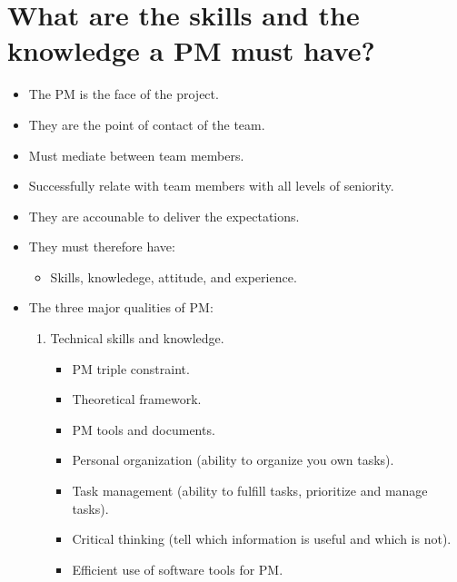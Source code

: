\section{What are the skills and the knowledge a PM must have?}
\begin{itemize}
    \item The PM is the face of the project.
    \item They are the point of contact of the team.
    \item Must mediate between team members.
    \item Successfully relate with team members with all levels of seniority.
    \item They are accounable to deliver the expectations.
    \item They must therefore have:
        \begin{itemize}
            \item Skills, knowledege, attitude, and experience.
        \end{itemize}
    
    \item The three major qualities of PM:
        \begin{enumerate}
            \item Technical skills and knowledge.
                \begin{itemize}
                    \item PM triple constraint.
                    \item Theoretical framework.
                    \item PM tools and documents.
                    \item Personal organization (ability to organize you own tasks).
                    \item Task management (ability to fulfill tasks, prioritize and manage tasks).
                    \item Critical thinking (tell which information is useful and which is not).
                    \item Efficient use of software tools for PM.
                \end{itemize}


\end{enumerate}
\end{itemize}
